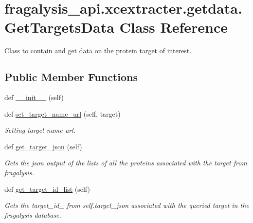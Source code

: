 \hypertarget{classfragalysis__api_1_1xcextracter_1_1getdata_1_1_get_targets_data}{}\section{fragalysis\+\_\+api.\+xcextracter.\+getdata.\+Get\+Targets\+Data Class Reference}
\label{classfragalysis__api_1_1xcextracter_1_1getdata_1_1_get_targets_data}


Class to contain and get data on the protein target of interest.  


\subsection*{Public Member Functions}
\begin{DoxyCompactItemize}
\item 
def \hyperlink{classfragalysis__api_1_1xcextracter_1_1getdata_1_1_get_targets_data_a40260f1d84f75c354f8b1b7124732b3a}{\+\_\+\+\_\+init\+\_\+\+\_\+} (self)
\item 
def \hyperlink{classfragalysis__api_1_1xcextracter_1_1getdata_1_1_get_targets_data_abf5179a2489b7edaa16dc6bc8c89f051}{set\+\_\+target\+\_\+name\+\_\+url} (self, target)
\begin{DoxyCompactList}\small\item\em Setting target name url. \end{DoxyCompactList}\item 
def \hyperlink{classfragalysis__api_1_1xcextracter_1_1getdata_1_1_get_targets_data_ab67e7a9bfced7f671422ef8f4b6997c9}{get\+\_\+target\+\_\+json} (self)
\begin{DoxyCompactList}\small\item\em Gets the json output of the lists of all the proteins associated with the target from fragalysis. \end{DoxyCompactList}\item 
def \hyperlink{classfragalysis__api_1_1xcextracter_1_1getdata_1_1_get_targets_data_af26e1f97fa431c2bb490985e7af0eb45}{get\+\_\+target\+\_\+id\+\_\+list} (self)
\begin{DoxyCompactList}\small\item\em Gets the target\+\_\+id\+\_\+ from self.\+target\+\_\+json associated with the queried target in the fragalysis database. \end{DoxyCompactList}\end{DoxyCompactItemize}
